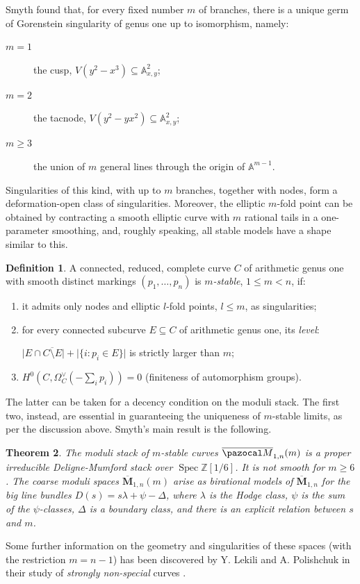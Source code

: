 \documentclass{compositio}
\newcommand{\Aaff}{\mathbb A}
\newcommand{\oM}{\overline{\pazocal M}}
\theoremstyle{plain}
\newtheorem{thm}{Theorem}[section]
\theoremstyle{definition}
\newtheorem{definition}[thm]{Definition}
\theoremstyle{remark}
\begin{document}
Smyth found that, for every fixed number $m$ of branches, there is a unique germ of Gorenstein singularity of genus one up to isomorphism, namely:
\begin{description}
 \item[$m=1$] the cusp, $V(y^2-x^3)\subseteq\Aaff^2_{x,y}$;
 \item[$m=2$] the tacnode, $V(y^2-yx^2)\subseteq\Aaff^2_{x,y}$;
 \item[$m\geq 3$] the union of $m$ general lines through the origin of $\Aaff^{m-1}$.
\end{description}
Singularities of this kind, with up to $m$ branches, together with nodes, form a deformation-open class of singularities. Moreover, the elliptic $m$-fold point can be obtained by contracting a smooth elliptic curve with $m$ rational tails in a one-parameter smoothing, and, roughly speaking, all stable models have a shape similar to this.
\begin{definition}\cite{SMY1}
 A connected, reduced, complete curve $C$ of arithmetic genus one with smooth distinct markings $(p_1,\ldots,p_n)$ is \emph{$m$-stable}, $1\leq m<n$, if:
 \begin{enumerate}[leftmargin=0.7cm]
  \item it admits only nodes and elliptic $l$-fold points, $l\leq m$, as singularities;
  \item for every connected subcurve $E\subseteq C$ of arithmetic genus one, its \emph{level}:
  
  \noindent$\lvert E\cap\overline{C\setminus E}\rvert+\lvert\{i\colon p_i\in E\}\rvert$ is strictly larger than $m$;
  \item $H^0(C,\Omega_C^\vee(-\sum_i p_i))=0$ (finiteness of automorphism groups).
 \end{enumerate}
\end{definition}
The latter can be taken for a decency condition on the moduli stack. The first two, instead, are essential in guaranteeing the uniqueness of $m$-stable limits, as per the discussion above. Smyth's main result is the following.
\begin{thm}\cite{SMY1,SMY2}
 The moduli stack of $m$-stable curves $\oM_{1,n}(m)$ is a proper irreducible Deligne-Mumford stack over $\operatorname{Spec}\mathbb Z[1/6]$. It is \emph{not} smooth for $m\geq 6$. The coarse moduli spaces $\overline{\mathbf{M}}_{1,n}(m)$ arise as birational models of $\overline{\mathbf{M}}_{1,n}$ for the big line bundles $D(s)=s\lambda+\psi-\Delta$, where $\lambda$ is the Hodge class, $\psi$ is the sum of the $\psi$-classes, $\Delta$ is a boundary class, and there is an explicit relation between $s$ and $m$.
\end{thm}
Some further information on the geometry and singularities of these spaces (with the restriction $m=n-1$) has been discovered by Y. Lekili and A. Polishchuk in their study of \emph{strongly non-special} curves \cite{Lekili-Polishchuk}.
\end{document}
